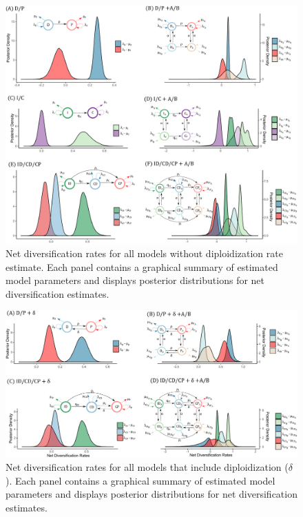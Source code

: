 
\begin{figure}
\includegraphics[width=\textwidth]{allnetdivmodelswithoutdelta.pdf}
\caption{Net diversification rates for all models without diploidization rate estimate. 
Each panel contains a graphical summary of estimated model parameters and displays posterior distributions for net diversification estimates.}
\label{figure:netdivall}
\end{figure}

\begin{figure}
\includegraphics[width=\textwidth]{allnetdivmodelsdiploidization.pdf}
\caption{Net diversification rates for all models that include diploidization ($\delta$). 
Each panel contains a graphical summary of estimated model parameters and displays posterior distributions for net diversification estimates.}  
\label{figure:netdivnodip}
\end{figure}

